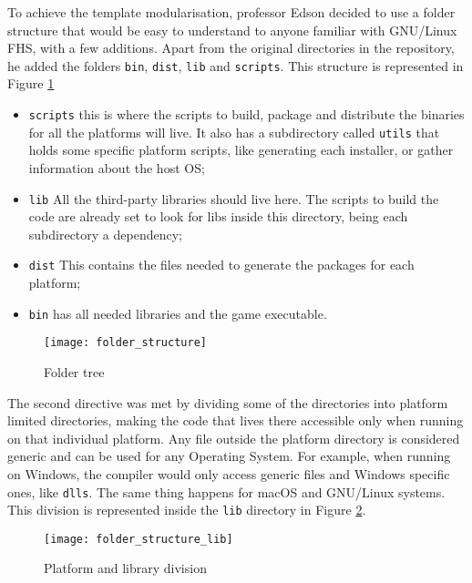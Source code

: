 To achieve the template modularisation, professor Edson decided to use a folder structure that would be easy to understand to anyone familiar with GNU/Linux FHS, with a few additions. Apart from the original directories in the repository, he added the folders \texttt{bin}, \texttt{dist}, \texttt{lib} and \texttt{scripts}. This structure is represented in Figure \ref{fig:folder_structure}

\begin{itemize}
\item \texttt{scripts} this is where the scripts to build, package and distribute the binaries for all the platforms will live. It also has a subdirectory called \texttt{utils} that holds some specific platform scripts, like generating each installer, or gather information about the host OS;
\item \texttt{lib} All the third-party libraries should live here. The scripts to build the code are already set to look for libs inside this directory, being each subdirectory a dependency;
\item \texttt{dist} This contains the files needed to generate the packages for each platform;
\item \texttt{bin} has all needed libraries and the game executable.

\end{itemize}

\begin{figure}[h!]
\centering
\texttt{[image: folder\_structure]}
\caption{Folder tree}
\label{fig:folder_structure}
\end{figure}

The second directive was met by dividing some of the directories into platform limited directories, making the code that lives there accessible only when running on that individual platform. Any file outside the platform directory is considered generic and can be used for any Operating System. For example, when running on Windows, the compiler would only access generic files and Windows specific ones, like \texttt{dlls}. The same thing happens for macOS and GNU/Linux systems. This division is represented inside the \texttt{lib} directory in Figure \ref{fig:folder_structure_lib}.

\begin{figure}[h!]
\centering
\texttt{[image: folder\_structure\_lib]}
\caption{Platform and library division}
\label{fig:folder_structure_lib}
\end{figure}

